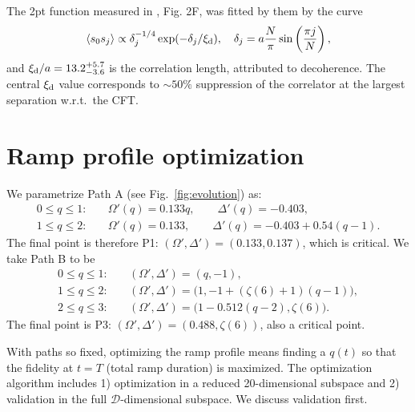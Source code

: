 \documentclass[a4paper,11pt]{article}
\theoremstyle{remark}
\theoremstyle{theorem}
\begin{document}
The 2pt function measured in {\cite{Fang:2024uyf}}, Fig. 2F, was fitted by
them by the curve
\begin{equation}
	\langle s_0 s_j \rangle \propto \delta^{- 1 / 4}_j \exp (- \delta_j / \xi_{\rm d} ),
	\quad \delta_j = a \frac{N}{\pi} \sin \left( \frac{\pi j}{N} \right),
\end{equation}
and $\xi_{\rm d} / a = 13.2^{+ 5.7}_{- 3.6}$ is the correlation length, attributed to
decoherence. The central $\xi_{\rm d}$ value corresponds to $\sim50\%$ suppression of
the correlator at the largest separation w.r.t.~the CFT.

\section{Ramp profile optimization}\label{sec:optim}

We parametrize Path A (see Fig.~\ref{fig:evolution}) as:
\begin{align}
0\leq q\leq1:&\quad
\Omega'(q)=0.133q,\qquad \Delta'(q)=-0.403, \nonumber\\
1\leq q\leq2:&\quad
\Omega'(q)=0.133,\qquad \Delta'(q)=-0.403+0.54(q-1). \label{eq:PA}
\end{align}
The final point is therefore P1: $(\Omega',\Delta')=(0.133,0.137)$, which is critical.
We take Path B to be 
\begin{align}\label{PathB}
0\leq q\leq1:&\quad (\Omega',\Delta')=(q,-1), \nonumber\\
1\leq q\leq2:&\quad (\Omega',\Delta')=\bigl(1,-1+(\zeta(6)+1)(q-1)\bigr), \nonumber\\
2\leq q\leq3:&\quad (\Omega',\Delta')=\bigl(1-0.512(q-2),\zeta(6)\bigr). 
\end{align}
The final point is P3: $(\Omega',\Delta')=(0.488,\zeta(6))$, also a critical point.

With paths so fixed, optimizing the ramp profile means finding a $q(t)$ so that the fidelity at $t=T$ (total ramp duration) is maximized. The optimization algorithm includes 1) optimization in a reduced 20-dimensional
subspace and 2) validation in the full $\mathcal{D}$-dimensional subspace. We discuss validation first.
\end{document}
